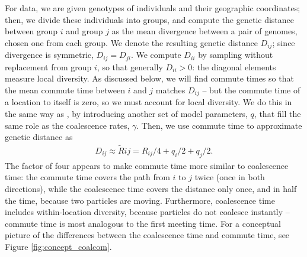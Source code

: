 \documentclass{article}
\newcommand{\comdist}{\widetilde R}
\begin{document}
For data, we are given genotypes of individuals and their geographic coordinates;
then, we divide these individuals into groups,
and compute the genetic distance between group $i$ and group $j$
as the mean divergence between a pair of genomes, chosen one from each group.
We denote the resulting genetic distance $D_{ij}$;
since divergence is symmetric, $D_{ij} = D_{ji}$.
We compute $D_{ii}$ by sampling without replacement from group $i$,
so that generally $D_{ii} > 0$: the diagonal elements measure local diversity.
As discussed below, we will find commute times so that the mean commute time between
$i$ and $j$ matches $D_{ij}$ -- but the commute time of a location to itself is zero,
so we must account for local diversity.
We do this in the same way as \citet{petkova2016visualizing},
by introducing another set of model parameters, $q$, 
that fill the same role as the coalescence rates, $\gamma$.
Then, we use commute time to approximate genetic distance as
\begin{align} \label{eq:commute_approx}
	D_{ij} \approx \comdist{ij} = R_{ij}/4 + q_{i}/2 + q_{j}/2 .
\end{align}
The factor of four appears to make commute time more similar to coalescence time:
the commute time covers the path from $i$ to $j$ twice
(once in both directions),
while the coalescence time covers the distance only once,
and in half the time, because two particles are moving.
Furthermore, coalescence time includes within-location diversity,
because particles do not coalesce instantly --
commute time is most analogous to the first meeting time.
For a conceptual picture of the differences between the coalescence time and commute time,
see Figure \ref{fig:concept_coalcom}. 
\end{document}
